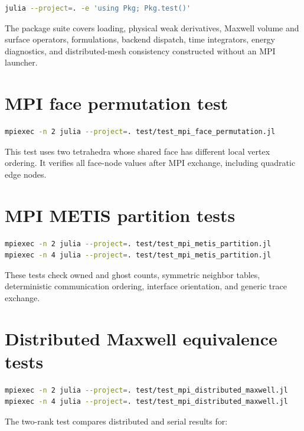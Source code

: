 \documentclass[11pt,oneside]{book}
\begin{document}
\begin{lstlisting}[language=bash]
julia --project=. -e 'using Pkg; Pkg.test()'
\end{lstlisting}

The package suite covers loading, physical weak derivatives, Maxwell volume
and surface operators, formulations, backend dispatch, time integrators,
energy diagnostics, and distributed-mesh consistency constructed without an
MPI launcher.

\section{MPI face permutation test}

\begin{lstlisting}[language=bash]
mpiexec -n 2 julia --project=. test/test_mpi_face_permutation.jl
\end{lstlisting}

This test uses two tetrahedra whose shared face has different local vertex
ordering. It verifies all face-node values after MPI exchange, including
quadratic edge nodes.

\section{MPI METIS partition tests}

\begin{lstlisting}[language=bash]
mpiexec -n 2 julia --project=. test/test_mpi_metis_partition.jl
mpiexec -n 4 julia --project=. test/test_mpi_metis_partition.jl
\end{lstlisting}

These tests check owned and ghost counts, symmetric neighbor tables,
deterministic communication ordering, interface orientation, and generic trace
exchange.

\section{Distributed Maxwell equivalence tests}

\begin{lstlisting}[language=bash]
mpiexec -n 2 julia --project=. test/test_mpi_distributed_maxwell.jl
mpiexec -n 4 julia --project=. test/test_mpi_distributed_maxwell.jl
\end{lstlisting}

The two-rank test compares distributed and serial results for:
\end{document}
